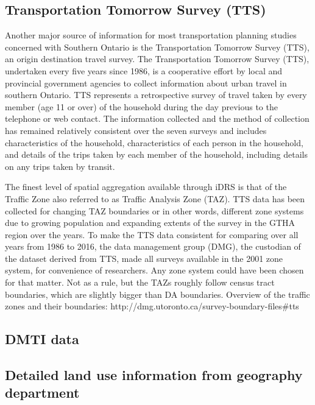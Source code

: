 \subsection{Transportation Tomorrow Survey (TTS)} \label{subsec:tts_description}

Another major source of information for most transportation planning studies concerned with Southern Ontario is the Transportation Tomorrow Survey (TTS)\cite{DataManagementGroup2014}, an origin destination travel survey.
The Transportation Tomorrow Survey (TTS), undertaken every five years since 1986, is a cooperative effort by local and provincial government agencies to collect information about urban travel in southern Ontario.
TTS represents a retrospective survey of travel taken by every member (age 11 or over) of the household during the day previous to the telephone or web contact.
The information collected and the method of collection has remained relatively consistent over the seven surveys and includes characteristics of the household, characteristics of each person in the household, and details of the trips taken by each member of the household, including details on any trips taken by transit\cite{Ashby2018}.

The finest level of spatial aggregation available through iDRS is that of the Traffic Zone also referred to as Traffic Analysis Zone (TAZ).
TTS data has been collected for changing TAZ boundaries or in other words, different zone systems due to growing population and expanding extents of the survey in the GTHA region over the years.
To make the TTS data consistent for comparing over all years from 1986 to 2016, the data management group (DMG), the custodian of the dataset derived from TTS, made all surveys available in the 2001 zone system, for convenience of researchers.
Any zone system could have been chosen for that matter.
Not as a rule, but the TAZs roughly follow census tract boundaries, which are slightly bigger than DA boundaries.
Overview of the traffic zones and their boundaries: http://dmg.utoronto.ca/survey-boundary-files#tts

\subsection{DMTI data} \label{subsec:dmti_data}


\subsection{Detailed land use information from geography department} \label{subsec:detailed_land_use_from_geogrpahy_department}

